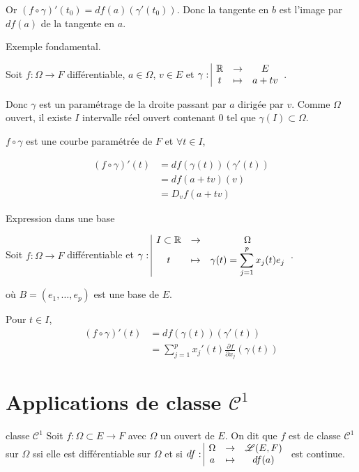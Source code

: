 Or $(f \circ \gamma)'(t_0) = df(a)(\gamma'(t_0))$. Donc la tangente en $b$ est l'image par 
$df(a)$ de la tangente en $a$. 

\begin{exemple}
    Exemple fondamental. 

    Soit $f : \Omega \to F$ différentiable, $a \in \Omega$, $v \in E$ et 
    $\gamma: \space \begin{array}{|ccc} \displaystyle \mathbb{R} & \to & \displaystyle E \\ \displaystyle t & \mapsto & \displaystyle a + t v \end{array}$.

    Donc $\gamma$ est un paramétrage de la droite passant par $a$ dirigée par $v$. Comme 
    $\Omega$ ouvert, il existe $I$ intervalle réel ouvert contenant $0$ tel que 
    $\gamma(I) \subset \Omega$. 

    $f \circ \gamma$ est une courbe paramétrée de $F$ et $\forall t \in I$, 
    

    \begin{align}
        (f \circ \gamma)'(t) & = df(\gamma(t))(\gamma'(t)) \\
        & = df(a + t v)(v) \\
        & = D_v f(a + t v)
    \end{align}
\end{exemple}

\begin{exemple}
    Expression dans une base 

    Soit $f : \Omega \to F$ différentiable et 
    $\gamma: \space \begin{array}{|ccc} \displaystyle I \subset \mathbb{R} & \to & \displaystyle \Omega \\ \displaystyle t & \mapsto & \displaystyle \gamma(t) = \displaystyle \sum_{j = 1}^{p } x_j(t) e_j \end{array}$.

    où $B = (e_1, \ldots, e_p)$ est une base de $E$. 

    Pour $t \in I$, 
    \begin{align}
        (f \circ \gamma)'(t) & = df(\gamma(t))(\gamma'(t)) \\
        & = \sum_{j = 1 }^{p } x_j'(t) \frac{\partial f }{\partial x_j }(\gamma(t))
    \end{align}
\end{exemple}

\section{Applications de classe \texorpdfstring{$\mathscr C^1$}{C1}}

\begin{definition}{classe $\mathscr{C}^1$}{}
    Soit $f : \Omega \subset E \to F$ avec $\Omega$ un ouvert de $E$. 
    On dit que $f$ est de classe $\mathscr C^1$ sur $\Omega$ ssi elle est 
    différentiable sur $\Omega$ et si $df: \space \begin{array}{|ccc} \displaystyle \Omega & \to & \displaystyle \mathscr L(E, F) \\ \displaystyle a & \mapsto & \displaystyle df(a) \end{array}$
    est continue. 
\end{definition}

